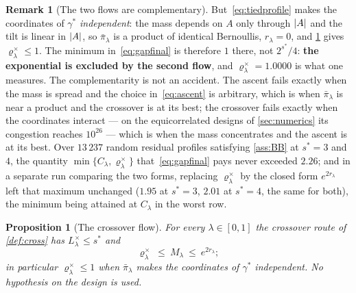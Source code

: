 \documentclass[aos]{imsart}
\DeclarePairedDelimiter{\abs}{\lvert}{\rvert}
\theoremstyle{plain}
\newtheorem{proposition}{Proposition}[section]
\theoremstyle{definition}
\newtheorem{remark}{Remark}[section]
\begin{document}
\begin{remark}[The two flows are complementary]
        But~\eqref{eq:tiedprofile} makes the coordinates of $\gamma^{\ast}$
        \emph{independent}: the mass depends on $A$ only through $\abs A$
        and the tilt is linear in $\abs A$, so $\bar\pi_\lambda$ is a
        product of identical Bernoullis, $r_\lambda=0$, and
        \cref{prop:cross} gives $\varrho^{\times}_\lambda\leq1$. The minimum
        in~\eqref{eq:gapfinal} is therefore $1$ there, not $2^{s^{\ast}}/4$:
        \textbf{the exponential is excluded by the second flow}, and
        $\varrho^{\times}_\lambda=1.0000$ is what one measures. The
        complementarity is not an accident. The ascent fails exactly when
        the mass is spread and the choice in~\eqref{eq:ascent} is arbitrary,
        which is when $\bar\pi_\lambda$ is near a product and the crossover
        is at its best; the crossover fails exactly when the coordinates
        interact --- on the equicorrelated designs of \cref{sec:numerics}
        its congestion reaches $10^{26}$ --- which is when the mass
        concentrates and the ascent is at its best. Over $13\,237$ random
        residual profiles satisfying \cref{ass:BB} at $s^{\ast}=3$ and $4$,
        the quantity $\min\{C_\lambda,\varrho^{\times}_\lambda\}$
        that~\eqref{eq:gapfinal} pays never exceeded $2.26$; and in a separate
        run comparing the two forms, replacing $\varrho^{\times}_\lambda$ by
        the closed form $e^{2r_\lambda}$ left that maximum unchanged
        ($1.95$ at $s^{\ast}=3$, $2.01$ at $s^{\ast}=4$, the same for both),
        the minimum being attained at $C_\lambda$ in the worst row.
    \end{remark}

    \begin{proposition}[The crossover flow]
        \label{prop:cross}
        For every $\lambda\in[0,1]$ the crossover route of
        \cref{def:cross} has $L^{\times}_\lambda\leq s^{\ast}$ and
        \begin{equation}
            \label{eq:crossprop}
            \varrho^{\times}_\lambda\ \leq\ M_\lambda\ \leq\ e^{2r_\lambda} ;
        \end{equation}
        in particular $\varrho^{\times}_\lambda\leq1$ when $\bar\pi_\lambda$
        makes the coordinates of $\gamma^{\ast}$ independent. No hypothesis
        on the design is used.
    \end{proposition}
\end{document}
